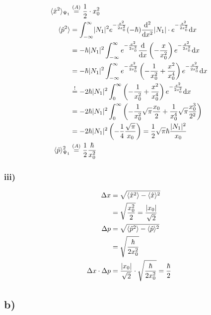 \begin{align*}
        \langle \hat{x}^2 \rangle_{\Psi_1} &\stackrel{(A)}{=} \frac{1}{2} \cdot x_0^2\\
        \langle \hat{p}^2 \rangle &= \int_{-\infty}^{\infty} \lvert N_1\rvert^2 e^{- \frac{x^2}{2x_0^2}} (-\hbar) \frac{\mathrm{d}^2}{\mathrm{d}x^2} 
        \lvert N_1\rvert \cdot e^{- \frac{x^2}{2x_0^2}} \mathrm{d}x\\
        &= - \hbar \lvert N_1\rvert^2 \int_{-\infty}^{\infty} e^{- \frac{x^2}{2x_0^2}} \frac{\mathrm{d}}{\mathrm{d}x} \left( -\frac{x}{x_0^2} 
        \right) e^{- \frac{x^2}{2x_0^2}} \mathrm{d}x \nonumber\\
        &= - \hbar \lvert N_1\rvert^2 \int_{-\infty}^{\infty} e^{- \frac{x^2}{2x_0^2}} \left( -\frac{1}{x_0^2} + \frac{x^2}{x_0^4} \right) 
        e^{- \frac{x^2}{2x_0^2}} \mathrm{d}x \nonumber\\
        &\stackrel{!}{=} -2 \hbar \lvert N_1\rvert^2 \int_{0}^{\infty} \left( -\frac{1}{x_0^2} + \frac{x^2}{x_0^4} \right) e^{- \frac{x^2}{2x_0^2}}
        \mathrm{d}x \nonumber\\
        &= -2 \hbar \lvert N_1\rvert^2 \int_{0}^{\infty} \left( -\frac{1}{x_0^2} \sqrt{\pi} \frac{x_0}{2} + \frac{1}{x_0^4} \sqrt{\pi} \frac{x_0^3}{2^2}
        \right) \nonumber\\
        &= -2 \hbar \lvert N_1\rvert^2 \left( -\frac{1}{4} \frac{\sqrt{\pi}}{x_0} \right) = \frac{1}{2} \sqrt{\pi} \hbar \frac{\lvert N_1\rvert^2}{x_0} \nonumber\\
        \langle \hat{p} \rangle_{\Psi_1}^2 &\stackrel{(A)}{=} \frac{1}{2} \frac{\hbar}{x_0^2}
    \end{align*}

\subsubsection{iii)}

    \begin{align*}
        \Delta x &= \sqrt{\langle \hat{x}^2 \rangle - \langle \hat{x} \rangle^2}\\
        &= \sqrt{\frac{x_0^2}{2}} = \frac{\lvert x_0\rvert}{\sqrt{2}}\\
        \Delta p &= \sqrt{\langle \hat{p}^2 \rangle - \langle \hat{p} \rangle^2}\\
        &= \sqrt{\frac{\hbar}{2 x_0^2}}\\
        \Delta x \cdot \Delta p &= \frac{\lvert x_0\rvert}{\sqrt{2}} \cdot \sqrt{\frac{\hbar}{2 x_0^2}}
        = \frac{\hbar}{2}
    \end{align*}

\subsection{b)}

